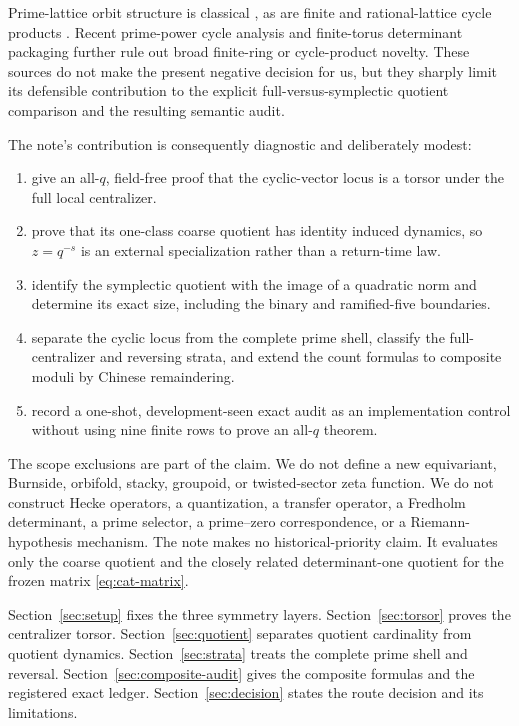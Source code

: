 \documentclass[11pt]{article}
\theoremstyle{definition}
\theoremstyle{remark}
\begin{document}
Prime-lattice orbit structure is classical \citep{Gaspari1994}, as are
finite and rational-lattice cycle products
\citep{BaakeRobertsWeiss2008}.  Recent prime-power cycle analysis
\citep{TanLi2025} and finite-torus determinant packaging
\citep{Chandra2026} further rule out broad finite-ring or cycle-product
novelty.  These sources do not make the present negative decision for us,
but they sharply limit its defensible contribution to the explicit
full-versus-symplectic quotient comparison and the resulting semantic audit.

The note's contribution is consequently diagnostic and deliberately modest:
\begin{enumerate}
  \item give an all-\(q\), field-free proof that the cyclic-vector locus is a
        torsor under the full local centralizer.
  \item prove that its one-class coarse quotient has identity induced
        dynamics, so \(z=q^{-s}\) is an external specialization rather than
        a return-time law.
  \item identify the symplectic quotient with the image of a quadratic norm
        and determine its exact size, including the binary and ramified-five
        boundaries.
  \item separate the cyclic locus from the complete prime shell, classify the
        full-centralizer and reversing strata, and extend the count formulas
        to composite moduli by Chinese remaindering.
  \item record a one-shot, development-seen exact audit as an implementation
        control without using nine finite rows to prove an all-\(q\) theorem.
\end{enumerate}

The scope exclusions are part of the claim.  We do not define a new
equivariant, Burnside, orbifold, stacky, groupoid, or twisted-sector zeta
function.  We do not construct Hecke operators, a quantization, a transfer
operator, a Fredholm determinant, a prime selector, a prime--zero
correspondence, or a Riemann-hypothesis mechanism.  The note makes no
historical-priority claim.  It evaluates only the coarse quotient and the
closely related determinant-one quotient for the frozen matrix
\eqref{eq:cat-matrix}.

Section~\ref{sec:setup} fixes the three symmetry layers.
Section~\ref{sec:torsor} proves the centralizer torsor.
Section~\ref{sec:quotient} separates quotient cardinality from quotient
dynamics.  Section~\ref{sec:strata} treats the complete prime shell and
reversal.  Section~\ref{sec:composite-audit} gives the composite formulas and
the registered exact ledger.  Section~\ref{sec:decision} states the route
decision and its limitations.
\end{document}

